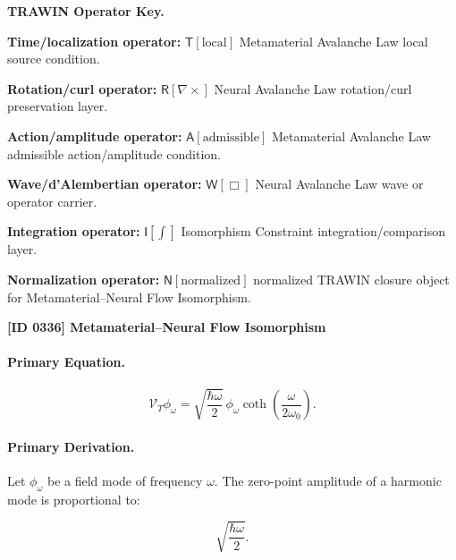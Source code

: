 \par\vspace{0.45\baselineskip}
\noindent\begin{minipage}[t]{\linewidth}
\begingroup
\small
\raggedright
\textbf{TRAWIN Operator Key.}\par
\noindent\textbf{Time/localization operator:} $\mathsf{T}\!\left[\mathrm{local}\right]$ Metamaterial Avalanche Law local source condition.\par
\noindent\textbf{Rotation/curl operator:} $\mathsf{R}\!\left[\nabla\times\right]$ Neural Avalanche Law rotation/curl preservation layer.\par
\noindent\textbf{Action/amplitude operator:} $\mathsf{A}\!\left[\mathrm{admissible}\right]$ Metamaterial Avalanche Law admissible action/amplitude condition.\par
\noindent\textbf{Wave/d'Alembertian operator:} $\mathsf{W}\!\left[\Box\right]$ Neural Avalanche Law wave or operator carrier.\par
\noindent\textbf{Integration operator:} $\mathsf{I}\!\left[\int\right]$ Isomorphism Constraint integration/comparison layer.\par
\noindent\textbf{Normalization operator:} $\mathsf{N}\!\left[\mathrm{normalized}\right]$ normalized TRAWIN closure object for Metamaterial--Neural Flow Isomorphism.\par
\endgroup
\end{minipage}

\clearpage
\noindent\textbf{[ID 0336] Metamaterial--Neural Flow Isomorphism}\par
\vspace{0.35em}
\paragraph{Primary Equation.}
\begin{equation}
\mathcal{V}_T\phi_{\omega}
=
\sqrt{
\frac{\hbar\omega}{2}
}
\,\phi_{\omega}
\coth\left(
\frac{\omega}{2\omega_0}
\right).
\end{equation}

\paragraph{Primary Derivation.}
Let $\phi_{\omega}$ be a field mode of frequency $\omega$.  
The zero-point amplitude of a harmonic mode is proportional to:

\begin{equation}
\sqrt{\frac{\hbar\omega}{2}} .
\end{equation}

